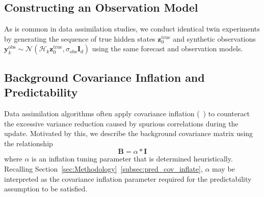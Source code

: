 \documentclass[final,1p,times]{elsarticle}
\begin{document}
\subsection{Constructing an Observation Model}  

As is common in data assimilation studies, we conduct identical twin experiments by generating the sequence of true hidden states $ \mathbf{z}_{0}^{\mathrm{true}} $ and synthetic observations $ \mathbf{y}^{\mathrm{obs}}_k \sim \mathcal{N}\left(\mathcal{H}_k\mathbf{z}_{0}^{\mathrm{true}}, \sigma_{\mathrm{obs}} \mathbf{I}_{d}\right) $ using the same forecast and observation models.

\subsection{Background Covariance Inflation and Predictability}\label{subsubsec:inflate_bound} 

Data assimilation algorithms often apply covariance inflation  (~\cite{Anderson1999, Anderson2007, Anderson2009, Bocquet2012, Miyoshi2011, Luo2013}) to counteract the excessive variance reduction caused by spurious correlations during the update. 
Motivated by this, we describe the background covariance matrix using the relationship
\begin{equation}
    \mathbf{B} = \alpha * \mathbf{I}    \label{eq:background_cov_inflate}
\end{equation}
where $\alpha$ is an inflation tuning parameter that is determined heuristically. 
Recalling Section~\ref{sec:Methodology}~\ref{subsec:pred_cov_inflate}, $\alpha$ may be interpreted as the covariance inflation parameter required for the predictability assumption to be satisfied. 
\end{document}
